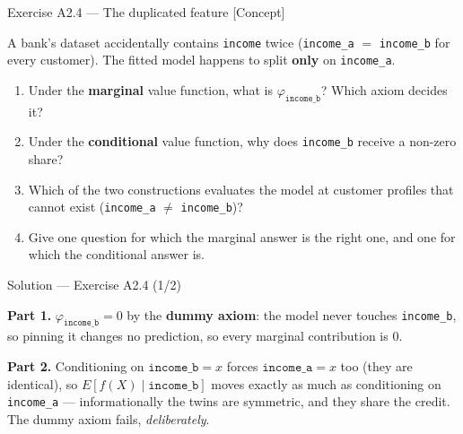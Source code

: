 \documentclass[aspectratio=169,11pt]{beamer}
\begin{document}
\begin{frame}{Exercise A2.4 --- The duplicated feature [Concept]}
\begin{exercise}
  A bank's dataset accidentally contains \texttt{income} twice
  (\texttt{income\_a} $=$ \texttt{income\_b} for every customer). The fitted
  model happens to split \textbf{only} on \texttt{income\_a}.
  \begin{enumerate}
    \item Under the \textbf{marginal} value function, what is
          $\varphi_{\texttt{income\_b}}$? Which axiom decides it?
    \item Under the \textbf{conditional} value function, why does
          \texttt{income\_b} receive a non-zero share?
    \item Which of the two constructions evaluates the model at customer
          profiles that cannot exist (\texttt{income\_a} $\neq$
          \texttt{income\_b})?
    \item Give one question for which the marginal answer is the right one, and
          one for which the conditional answer is.
  \end{enumerate}
\end{exercise}
\end{frame}

\begin{frame}{Solution --- Exercise A2.4 (1/2)}
\begin{solutionbox}
  \textbf{Part 1.} $\varphi_{\texttt{income\_b}} = 0$ by the \textbf{dummy axiom}:
  the model never touches \texttt{income\_b}, so pinning it changes no prediction,
  so every marginal contribution is $0$.

  \smallskip
  \textbf{Part 2.} Conditioning on $\texttt{income\_b}=x$ forces
  $\texttt{income\_a}=x$ too (they are identical), so
  $E[f(X)\mid \texttt{income\_b}]$ moves exactly as much as conditioning on
  \texttt{income\_a} --- informationally the twins are symmetric, and they share
  the credit. The dummy axiom fails, \emph{deliberately}.
\end{solutionbox}
\end{frame}
\end{document}

